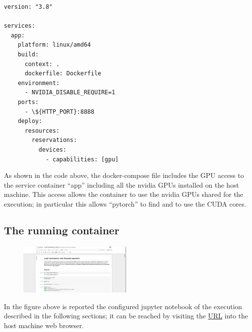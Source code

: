 \documentclass[conference]{IEEEtran}
\begin{document}
\begin{lstlisting}
version: "3.8"

services:
  app:
    platform: linux/amd64
    build:
      context: .
      dockerfile: Dockerfile
    environment:
      - NVIDIA_DISABLE_REQUIRE=1
    ports:
      - \${HTTP_PORT}:8888
    deploy:
      resources:
        reservations:
          devices:
            - capabilities: [gpu]
\end{lstlisting}

As shown in the code above, the docker-compose file includes the GPU access \cite{gpu-support} to the service container “app” including all the nvidia GPUs installed on the host machine. This access allows the container to use the nvidia GPUs shared for the execution; in particular this allows “pytorch” to find and to use the CUDA cores.

\subsection{The running container}\label{sec:The running container}

\begin{figure}[htbp]
		\centering
			\includegraphics[width=0.50\textwidth]{logp-optimization.png}
		\label{fig:logp-optimization}
	\end{figure}

In the figure above is reported the configured jupyter notebook of the execution described in the following sections; it can be reached by visiting the \href{http://localhost:{HTTP_PORT}/LogP_optimization_demo.ipynb}{URL} into the host machine web browser.
\end{document}
